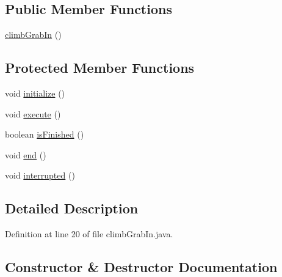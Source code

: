 \subsection*{Public Member Functions}
\begin{DoxyCompactItemize}
\item 
\mbox{\hyperlink{classorg_1_1usfirst_1_1frc3707_1_1_creedence_1_1commands_1_1climb_grab_in_a056e522299187dd753ffb81a034a0e36}{climb\+Grab\+In}} ()
\end{DoxyCompactItemize}
\subsection*{Protected Member Functions}
\begin{DoxyCompactItemize}
\item 
void \mbox{\hyperlink{classorg_1_1usfirst_1_1frc3707_1_1_creedence_1_1commands_1_1climb_grab_in_a3bbaa7d8eef3bc7441cf23a76800c7e5}{initialize}} ()
\item 
void \mbox{\hyperlink{classorg_1_1usfirst_1_1frc3707_1_1_creedence_1_1commands_1_1climb_grab_in_a1e3ede7ddf091987cca60d9c47792a65}{execute}} ()
\item 
boolean \mbox{\hyperlink{classorg_1_1usfirst_1_1frc3707_1_1_creedence_1_1commands_1_1climb_grab_in_ace9bea1279ff4b9b87ace3e4d924ac0f}{is\+Finished}} ()
\item 
void \mbox{\hyperlink{classorg_1_1usfirst_1_1frc3707_1_1_creedence_1_1commands_1_1climb_grab_in_ab810151c1006f113e9668fc883989d28}{end}} ()
\item 
void \mbox{\hyperlink{classorg_1_1usfirst_1_1frc3707_1_1_creedence_1_1commands_1_1climb_grab_in_a0f731ef52b07ccb2637d13786113b065}{interrupted}} ()
\end{DoxyCompactItemize}


\subsection{Detailed Description}


Definition at line 20 of file climb\+Grab\+In.\+java.



\subsection{Constructor \& Destructor Documentation}
\mbox{\label{classorg_1_1usfirst_1_1frc3707_1_1_creedence_1_1commands_1_1climb_grab_in_a056e522299187dd753ffb81a034a0e36}} 
